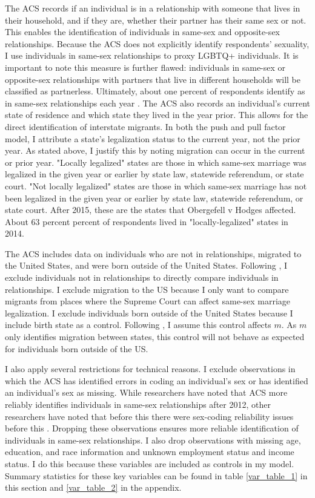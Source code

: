 \documentclass[12pt,letterpaper]{article}
\begin{document}
The ACS records if an individual is in a relationship with someone that lives in their household, and if they are, whether their partner has their same sex or not. This enables the identification of individuals in same-sex and opposite-sex relationships. Because the ACS does not explicitly identify respondents' sexuality, I use individuals in same-sex relationships to proxy LGBTQ+ individuals. It is important to note this measure is further flawed: individuals in same-sex or opposite-sex relationships with partners that live in different households will be classified as partnerless. Ultimately, about one percent of respondents identify as in same-sex relationships each year \citep{28}. The ACS also records an individual’s current state of residence and which state they lived in the year prior. This allows for the direct identification of interstate migrants. In both the push and pull factor model, I attribute a state’s legalization status to the current year, not the prior year. As stated above, I justify this by noting migration can occur in the current or prior year. "Locally legalized" states are those in which same-sex marriage was legalized in the given year or earlier by state law, statewide referendum, or state court. "Not locally legalized" states are those in which same-sex marriage has not been legalized in the given year or earlier by state law, statewide referendum, or state court. After 2015, these are the states that Obergefell v Hodges affected. About 63 percent percent of respondents lived in "locally-legalized" states in 2014. 

\FloatBarrier



The ACS includes data on individuals who are not in relationships, migrated to the United States, and were born outside of the United States. Following \citet{1}, I exclude individuals not in relationships to directly compare individuals in relationships. I exclude migration to the US because I only want to compare migrants from places where the Supreme Court can affect same-sex marriage legalization. I exclude individuals born outside of the United States because I include birth state as a control. Following \citet{12}, I assume this control affects $m$. As $m$ only identifies migration between states, this control will not behave as expected for individuals born outside of the US. 

I also apply several restrictions for technical reasons. I exclude observations in which the ACS has identified errors in coding an individual’s sex or has identified an individual’s sex as missing. While researchers have noted that ACS more reliably identifies individuals in same-sex relationships after 2012, other researchers have noted that before this there were sex-coding reliability issues before this \citep{3, 5, 7, 12}. Dropping these observations ensures more reliable identification of individuals in same-sex relationships. I also drop observations with missing age, education, and race information and unknown employment status and income status. I do this because these variables are included as controls in my model. Summary statistics for these key variables can be found in table \ref{var_table_1} in this section and \ref{var_table_2} in the appendix.
\end{document}
